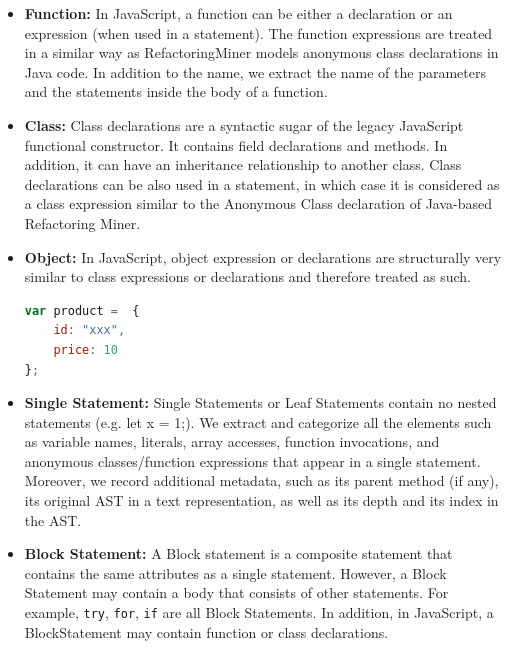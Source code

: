 \documentclass[letterpaper,12pt,onecolumn,final]{report}
\begin{document}
\begin{itemize}
\item \textbf{Function:} In JavaScript, a function can be either a declaration or an expression (when used in a statement). The function expressions are treated in a similar way as RefactoringMiner models anonymous class declarations in Java code. In addition to the name, we extract the name of the parameters and the statements inside the body of a function. 

\item \textbf{Class:} Class declarations are a syntactic sugar of the legacy JavaScript functional constructor. It contains field declarations and methods. In addition, it can have an inheritance relationship to another class. Class declarations can be also used in a statement, in which case it is considered as a class expression similar to the Anonymous Class declaration of Java-based Refactoring Miner.

\item \textbf{Object:} In JavaScript, object expression or declarations are structurally very similar to class expressions or declarations and therefore treated as such.

\begin{lstlisting}[language=JavaScript, caption=Object expression assigned to a variable, numbers=none, label={lst:objectLieral}]
var product =  {
    id: "xxx",
    price: 10
};
\end{lstlisting}

\item \textbf{Single Statement:}
Single Statements or Leaf Statements contain no nested statements (e.g. let x = 1;). We extract and categorize all the elements such as variable names, literals, array accesses, function invocations, and anonymous classes/function expressions that appear in a single statement. Moreover, we record additional metadata, such as its parent method (if any), its original AST in a text representation, as well as its depth and its index in the AST.

\item  \textbf{Block Statement:}
A Block statement is a composite statement that contains the same attributes as a single statement. However, a Block Statement may contain a body that consists of other statements. For example, \texttt{try}, \texttt{for}, \texttt{if} are all Block Statements. In addition, in JavaScript, a BlockStatement may contain function or class declarations.
\end{itemize}
\end{document}
